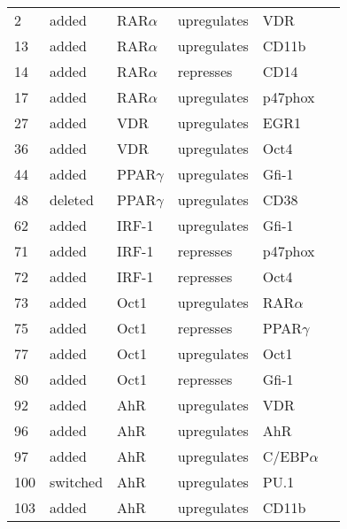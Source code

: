 

\begin{center}
\renewcommand{\arraystretch}{0.8}
\label{U937_Model}
\begin{scriptsize}
\begin{supertabular}{|p{2 cm}|p{2cm}|p{3cm}|p{2.5cm}|p{2cm}|p{1.5cm}|}  
\hline	

2 &  added & RAR$\alpha$  & upregulates &  VDR & \\
13 &  added & RAR$\alpha$  & upregulates &  CD11b & \\
14 &  added & RAR$\alpha$  & represses &  CD14 & \\
17 &  added & RAR$\alpha$  & upregulates &  p47phox & \\
27 &  added & VDR  & upregulates &  EGR1 & \\
36 &  added & VDR  & upregulates &  Oct4 & \\
44 &  added & PPAR$\gamma$  & upregulates &  Gfi-1 & \\
48 &  deleted &  PPAR$\gamma$  & upregulates &  CD38 & \\
62 &  added & IRF-1  & upregulates &  Gfi-1 & \\
71 &  added & IRF-1  & represses &  p47phox & \\
72 &  added & IRF-1  & represses &  Oct4 & \\
73 &  added & Oct1  & upregulates &  RAR$\alpha$ & \cite{Kakizawa1999}\\
75 &  added & Oct1  & represses &  PPAR$\gamma$ & \\
77 &  added & Oct1  & upregulates &  Oct1 & \cite{Pankratova2003}\\
80 &  added & Oct1  & represses &  Gfi-1 & \\
92 &  added & AhR  & upregulates &  VDR & \\
96 &  added & AhR  & upregulates &  AhR & \\
97 &  added & AhR  & upregulates &  C/EBP$\alpha$ & \\
100 &  switched &  AhR  & upregulates &  PU.1 & \\
103 &  added & AhR  & upregulates &  CD11b & \\

\end{supertabular}
\end{scriptsize}
\end{center}
